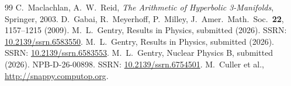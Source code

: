 \documentclass[12pt]{article}
\theoremstyle{definition}
\begin{document}
\begin{thebibliography}{99}
C.~Maclachlan, A.~W.~Reid,
\textit{The Arithmetic of Hyperbolic 3-Manifolds}, Springer, 2003.
D.~Gabai, R.~Meyerhoff, P.~Milley,
J.\ Amer.\ Math.\ Soc.\ \textbf{22}, 1157--1215 (2009).
M.~L.~Gentry, Results in Physics, submitted (2026).
SSRN: \href{https://doi.org/10.2139/ssrn.6583550}{10.2139/ssrn.6583550}.
M.~L.~Gentry, Results in Physics, submitted (2026).
SSRN: \href{https://doi.org/10.2139/ssrn.6583553}{10.2139/ssrn.6583553}.
M.~L.~Gentry, Nuclear Physics B, submitted (2026).
NPB-D-26-00898. SSRN: \href{https://doi.org/10.2139/ssrn.6754501}{10.2139/ssrn.6754501}.
M.~Culler et al., \url{http://snappy.computop.org}.
\end{thebibliography}
\end{document}
